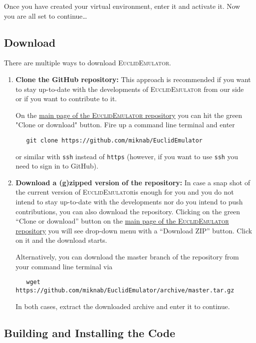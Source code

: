 \documentclass[american,11pt]{article}
\def\code#1{\texttt{#1}}
\begin{document}
Once you have created your virtual environment, enter it and activate it. Now you are all set to continue\dots

\subsection{Download}
There are multiple ways to download \textsc{EuclidEmulator}.

\begin{enumerate}
\item{\bfseries Clone the GitHub repository:} This approach is recommended if you want to stay up-to-date with the developments of \textsc{EuclidEmulator} from our side or if you want to contribute to it.

On the \href{https://github.com/miknab/EuclidEmulator}{main page of the \textsc{EuclidEmulator} repository} you can hit the green "Clone or download" button. Fire up a command line terminal and enter 

\begin{lstlisting}
   git clone https://github.com/miknab/EuclidEmulator
\end{lstlisting}

or similar with \code{ssh} instead of  \code{https} (however, if you want to use  \code{ssh} you need to sign in to GitHub). 

\item{\bfseries Download a (g)zipped version of the repository:} In case a snap shot of the current version of \textsc{EuclidEmulator}is enough for you and you do not intend to stay up-to-date with the developments nor do you intend to push contributions, you can also download the repository. Clicking on the green ``Clone or download'' button on the  \href{https://github.com/miknab/EuclidEmulator}{main page of the \textsc{EuclidEmulator} repository} you will see drop-down menu with a ``Download ZIP'' button. Click on it and the download starts. 

Alternatively, you can download the master branch of the repository from your command line terminal via

\begin{lstlisting}
   wget https://github.com/miknab/EuclidEmulator/archive/master.tar.gz
\end{lstlisting}

In both cases, extract the downloaded archive and enter it to continue.
\end{enumerate}

\subsection{Building and Installing the Code}
\end{document}
